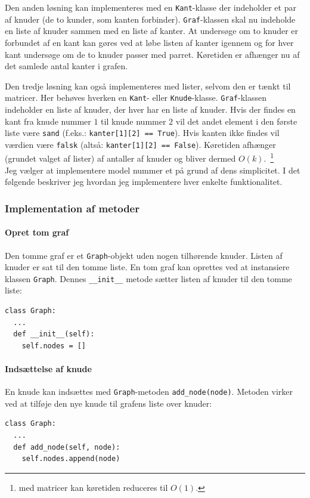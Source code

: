 \documentclass[10pt,a4paper,danish]{article}
\newcommand{\ct}{\texttt}
\begin{document}
Den anden løsning kan implementeres med en \ct{Kant}-klasse der
indeholder et par af knuder (de to kunder, som kanten
forbinder). \ct{Graf}-klassen skal nu indeholde en liste af knuder
sammen med en liste af kanter. At undersøge om to knuder er forbundet
af en kant kan gøres ved at løbe listen af kanter igennem og for hver
kant undersøge om de to knuder passer med parret. Køretiden er
afhænger nu af det samlede antal kanter i grafen.

Den tredje løsning kan også implementeres med lister, selvom den er
tænkt til matricer. Her behøves hverken en \ct{Kant}- eller
\ct{Knude}-klasse. \ct{Graf}-klassen indeholder en liste af knuder,
der hver har en liste af knuder. Hvis der findes en kant fra knude
nummer $1$ til knude nummer $2$ vil det andet element i den første
liste være \ct{sand} (f.eks.: \ct{kanter[1][2] == True}). Hvis kanten
ikke findes vil værdien være \ct{falsk} (altså: \ct{kanter[1][2] ==
  False}). Køretiden afhænger (grundet valget af lister) af antaller
af knuder og bliver dermed $O(k)$.\ \footnote{med matricer kan
  køretiden reduceres til $O(1)$.}\\

Jeg vælger at implementere model nummer et på grund af dens
simplicitet. I det følgende beskriver jeg hvordan jeg implementere
hver enkelte funktionalitet.

\subsubsection{Implementation af metoder}
\paragraph{Opret tom graf}
Den tomme graf er et \ct{Graph}-objekt uden nogen tilhørende
knuder. Listen af knuder er sat til den tomme liste. En tom graf kan
oprettes ved at instansiere klassen \ct{Graph}. Dennes \ct{\_\_init\_\_}
metode sætter listen af knuder til den tomme liste:
{\small
\begin{verbatim}
class Graph:
  ...
  def __init__(self):
    self.nodes = []
\end{verbatim}}

\paragraph{Indsættelse af knude}
En knude kan indsættes med \ct{Graph}-metoden
\ct{add\_node(node)}. Metoden virker ved at tilføje den nye knude til
grafens liste over knuder:
{\small
\begin{verbatim}
class Graph:
  ...
  def add_node(self, node):
    self.nodes.append(node)
\end{verbatim}}
\end{document}
